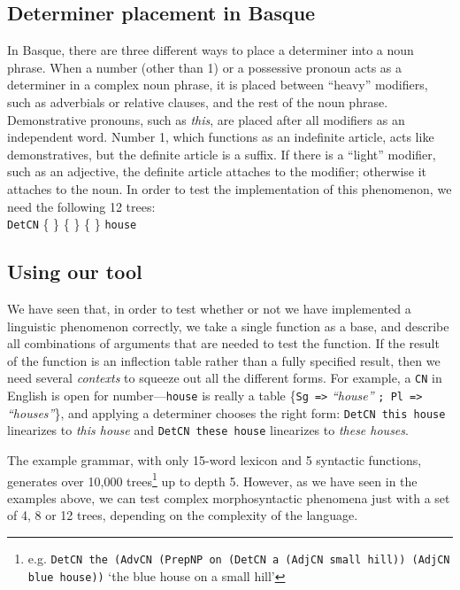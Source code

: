 \documentclass[11pt]{article}
\def\t#1{\texttt{#1}}
\newcommand{\tts}[1]{{\tt #1}}
\begin{document}
\subsection{Determiner placement in Basque} In Basque, there are three
different ways to place a determiner into a noun phrase. When a number
(other than 1) or a possessive pronoun acts as a determiner in a
complex noun phrase, it is placed between ``heavy'' modifiers, such as
adverbials or relative clauses, and the rest of the noun
phrase. Demonstrative pronouns, such as \emph{this}, are placed after
all modifiers as an independent word. Number 1, which functions as an
indefinite article, acts like demonstratives, but the definite article
is a suffix. If there is a ``light'' modifier, such as an adjective,
the definite article attaches to the modifier; otherwise it attaches
to the noun. In order to test the implementation of this phenomenon,
we need the following 12 trees:  \\ 
\t{DetCN} \{
\stackanchor{\stackanchor{}{\tts{the}}}{\stackanchor{\tts{this}}{\tts{your}}}
\} \{  \} 
\{  \}  {\tt house} 


\subsection{Using our tool} We have seen that, in order to test
whether or not we have implemented a linguistic phenomenon correctly,
we take a single function as a base, and describe all combinations of
arguments that are needed to test the function. If the result of the
function is an inflection table rather than a fully specified result,
then we need several \emph{contexts} to squeeze out all the different
forms. For example, a \t{CN} in English is open for number---\t{house}
is really a table \{\t{Sg =>} \emph{``house''} \t{; Pl =>}
\emph{``houses''}\}, and applying a determiner chooses the right form:
\t{DetCN this house} linearizes to \emph{this house} and \t{DetCN
  these house} linearizes to \emph{these houses}. 

\label{sec:wishlist_comments}
The example grammar, with only 15-word lexicon and 5 syntactic functions,
generates over 10,000 %
trees\footnote{e.g. {\tt DetCN the (AdvCN (PrepNP on
(DetCN a (AdjCN small hill)) (AdjCN blue house))} `the blue house on a
small hill'}  up to depth 5. 
However, as we have seen in the examples above, we can test complex morphosyntactic phenomena just with a set
of 4, 8 or 12 trees, depending on the complexity of the language.
\end{document}
